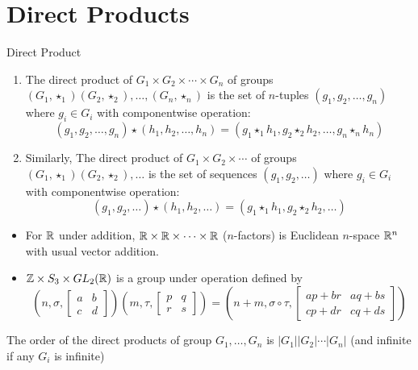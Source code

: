 \documentclass{report}
\newcommand{\mprop}[2]{\begin{Prop}{#1}{}#2\end{Prop}}
\newcommand{\ex}[2]{\begin{Example}{#1}{}#2\end{Example}}
\newcommand{\dfn}[2]{\begin{Definition}[colbacktitle=red!75!black]{#1}{}#2\end{Definition}}
\begin{document}
\section{Direct Products}
\dfn{Direct Product}{
\begin{enumerate}
    \item The direct product of $G_1 \times G_2 \times \cdots \times G_n$ of groups $(G_1, \star_1) (G_2, \star_2), \dots, (G_n, \star_n)$ is the set of $n$-tuples $(g_1, g_2, \dots, g_n)$ where $g_i \in G_i$ with componentwise operation: 
    $$(g_1, g_2, \dots, g_n) \star (h_1, h_2, \dots, h_n)= (g_1 \star_1 h_1, g_2 \star_2 h_2, \dots, g_n \star_n h_n)$$
    \item Similarly, The direct product of $G_1 \times G_2 \times \cdots $ of groups $(G_1, \star_1) (G_2, \star_2), \dots$ is the set of sequences $(g_1, g_2, \dots)$ where $g_i \in G_i$ with componentwise operation:
$$(g_1, g_2, \dots) \star (h_1, h_2, \dots)= (g_1 \star_1 h_1, g_2 \star_2 h_2, \dots)$$
\end{enumerate}}
\ex{}{
\begin{itemize}
    \item For $\mathbb{R}$ under addition, $\mathbb{R} \times \mathbb{R} \times \cdots \times \mathbb{R}$ ($n$-factors) is Euclidean $n$-space $\mathbb{R}^n$ with usual vector addition.
    \item $\mathbb{Z} \times S_3 \times GL_2(\mathbb{R})$ is a group under operation defined by
    $$(n, \sigma, \begin{bmatrix}
a & b\\
c & d
\end{bmatrix} )(m, \tau, \begin{bmatrix}
p & q\\
r & s
\end{bmatrix} ) = (n+m , \sigma \circ \tau, \begin{bmatrix}
ap+br & aq + bs\\
cp + dr & cq+ds
\end{bmatrix} )$$
\end{itemize} }
\mprop{}{The order of the direct products of group $G_1, \dots, G_n$ is $|G_1||G_2| \cdots |G_n|$ (and infinite if any $G_i$ is infinite)}
\end{document}
